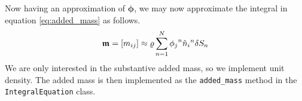 Now having an approximation of $\symbf{\phi}$, we may now approximate the integral in equation \eqref{eq:added_mass} as follows.
\[
    \bm{\mathfrak{m}} = [m_{ij}] \approx \varrho \sum_{n = 1}^{N} {\phi_{j}}^{n} {\hat{n}}_{i}{}^{n} \delta S_{n}
\]
We are only interested in the substantive added mass, so we implement unit density.
The added mass is then implemented as the \texttt{added\_mass} method in the \texttt{IntegralEquation} class.
